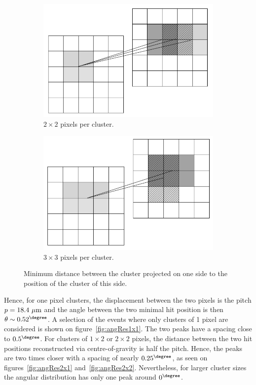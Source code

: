 \begin{figure}[!h]
      \begin{subfigure}[t]{0.45\textwidth}
        \centering
        \includegraphics[width = \textwidth]{Pictures/deformation/cluster_2x2.png}
        \caption{$2 \times 2$ pixels per cluster.}
      \end{subfigure}
      \quad
      \begin{subfigure}[t]{0.45\textwidth}
        \centering
        \includegraphics[width = \textwidth]{Pictures/deformation/cluster_3x3.png}
        \caption{$3 \times 3$ pixels per cluster.}
      \end{subfigure}
      \caption{Minimum distance between the cluster projected on one side to the position of the cluster of this side.}
      \label{fig:clusterSize}
   \end{figure}

   Hence, for one pixel clusters, the displacement between the two pixels is the pitch $p = 18.4~\rm{\mu m}$ and the angle between the two minimal hit position is then $\theta \sim 0.52^{\degree}$.
   A selection of the events where only clusters of 1 pixel are considered is shown on figure~\ref{fig:angRes1x1}.
   The two peaks have a spacing close to $0.5^{\degree}$.
   For clusters of $1 \times 2$ or $2 \times 2$ pixels, the distance between the two hit positions reconstructed via centre-of-gravity is half the pitch.
   Hence, the peaks are two times closer with a spacing of nearly $0.25^{\degree}$, as seen on figures~\ref{fig:angRes2x1} and~\ref{fig:angRes2x2}.
   Nevertheless, for larger cluster sizes the angular distribution has only one peak around $0^{\degree}$.


